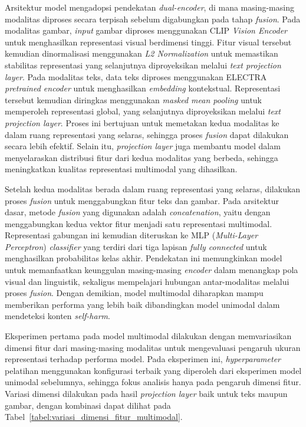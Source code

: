 Arsitektur model mengadopsi pendekatan \textit{dual-encoder}, di mana masing-masing modalitas diproses secara terpisah sebelum digabungkan pada tahap \textit{fusion}. Pada modalitas gambar, \textit{input} gambar diproses menggunakan CLIP \textit{Vision Encoder} untuk menghasilkan representasi visual berdimensi tinggi. Fitur visual tersebut kemudian dinormalisasi menggunakan \textit{L2 Normalization} untuk memastikan stabilitas representasi yang selanjutnya diproyeksikan melalui \textit{text projection layer}. Pada modalitas teks, data teks diproses menggunakan ELECTRA \textit{pretrained encoder} untuk menghasilkan \textit{embedding} kontekstual. Representasi tersebut kemudian diringkas menggunakan \textit{masked mean pooling} untuk memperoleh representasi global, yang selanjutnya diproyeksikan melalui \textit{text projection layer}. Proses ini bertujuan untuk memetakan kedua modalitas ke dalam ruang representasi yang selaras, sehingga proses \textit{fusion} dapat dilakukan secara lebih efektif. Selain itu, \textit{projection layer} juga membantu model dalam menyelaraskan distribusi fitur dari kedua modalitas yang berbeda, sehingga meningkatkan kualitas representasi multimodal yang dihasilkan.

Setelah kedua modalitas berada dalam ruang representasi yang selaras, dilakukan proses \textit{fusion} untuk menggabungkan fitur teks dan gambar. Pada arsitektur dasar, metode \textit{fusion} yang digunakan adalah \textit{concatenation}, yaitu dengan menggabungkan kedua vektor fitur menjadi satu representasi multimodal. Representasi gabungan ini kemudian diteruskan ke MLP (\textit{Multi-Layer Perceptron}) \textit{classifier} yang terdiri dari tiga lapisan \textit{fully connected} untuk menghasilkan probabilitas kelas akhir. Pendekatan ini memungkinkan model untuk memanfaatkan keunggulan masing-masing \textit{encoder} dalam menangkap pola visual dan linguistik, sekaligus mempelajari hubungan antar-modalitas melalui proses \textit{fusion}. Dengan demikian, model multimodal diharapkan mampu memberikan performa yang lebih baik dibandingkan model unimodal dalam mendeteksi konten \textit{self-harm}.

Eksperimen pertama pada model multimodal dilakukan dengan memvariasikan dimensi fitur dari masing-masing modalitas untuk mengevaluasi pengaruh ukuran representasi terhadap performa model. Pada eksperimen ini, \textit{hyperparameter} pelatihan menggunakan konfigurasi terbaik yang diperoleh dari eksperimen model unimodal sebelumnya, sehingga fokus analisis hanya pada pengaruh dimensi fitur. Variasi dimensi dilakukan pada hasil \textit{projection layer} baik untuk teks maupun gambar, dengan kombinasi dapat dilihat pada Tabel~\ref{tabel:variasi_dimensi_fitur_multimodal}.

